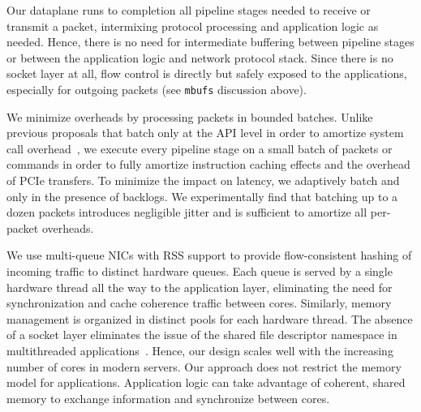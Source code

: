 

 Our dataplane 
runs to completion all pipeline stages needed to receive or transmit a
packet, intermixing protocol processing and application logic as
needed. Hence, there is no need for intermediate buffering between
pipeline stages or between the application logic and network protocol
stack. Since there is no socket layer at all, flow control is directly
but safely exposed to the applications, especially for outgoing
packets (see \texttt{mbufs} discussion  above).

We minimize overheads by processing packets in bounded batches.
Unlike previous proposals that batch only at the API level in order to
amortize system call overhead~\cite{jeong2014mtcp,han2012megapipe}, we
execute every pipeline stage on a small batch of packets or commands
in order to fully amortize instruction caching effects and the
overhead of PCIe transfers. To minimize the impact on latency, we
adaptively batch and only in the presence of backlogs. We
experimentally find that batching up to a dozen 
packets introduces negligible jitter and is sufficient to amortize all
per-packet overheads.


 We use multi-queue
NICs with RSS support to provide flow-consistent hashing of incoming
traffic to distinct hardware queues. Each queue is served by a single
hardware thread all the way to the application layer, eliminating the
need for synchronization and cache coherence traffic between
cores. Similarly, memory management is organized in distinct pools for
each hardware thread. The absence of a socket layer eliminates the
issue of the shared file descriptor namespace in multithreaded applications~\cite{DBLP:conf/sosp/ClementsKZMK13}. Hence,
our design scales well with the increasing number of cores in modern
servers. Our approach does not restrict the memory model for
applications. Application logic can take advantage of coherent, shared
memory to exchange information and synchronize between cores. 




